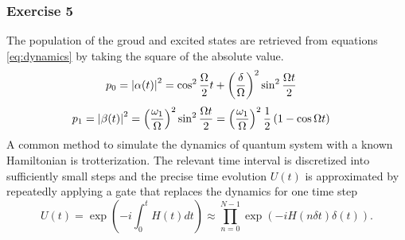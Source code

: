 \subsubsection{Exercise 5}
The population of the groud and excited states are retrieved from equations \eqref{eq:dynamics} by taking the square of the absolute value.
\begin{align}
    p_0 &= \left|\alpha(t)\right|^2 = \cos^2 \frac{\Omega}{2}t + \left(\frac{\delta}{\Omega}\right)^2\sin^2\frac{\Omega t}{2}
    \label{eq:population0}
\end{align}
\begin{align}
    p_1 &= \left|\beta (t)\right|^2  = \left(\frac{\omega_1}{\Omega}\right)^2\sin^2\frac{\Omega t}{2} = \left(\frac{\omega_1}{\Omega}\right)^2\frac{1}{2}\left(1-\cos\Omega t\right)
    \label{eq:population1}
\end{align}
A common method to simulate the dynamics of quantum system with a known Hamiltonian is trotterization. The relevant time interval is discretized into sufficiently small steps and the precise time evolution $U(t)$ is approximated by repeatedly applying a gate that replaces the dynamics for one time step
\begin{equation}
    U(t) = \exp\left(-i\int_0^tH(t)dt\right) \approx \prod^{N-1}_{n=0}\exp\left(-iH(n\delta t)\delta(t)\right).
    \label{eq:trotterization}
\end{equation}

